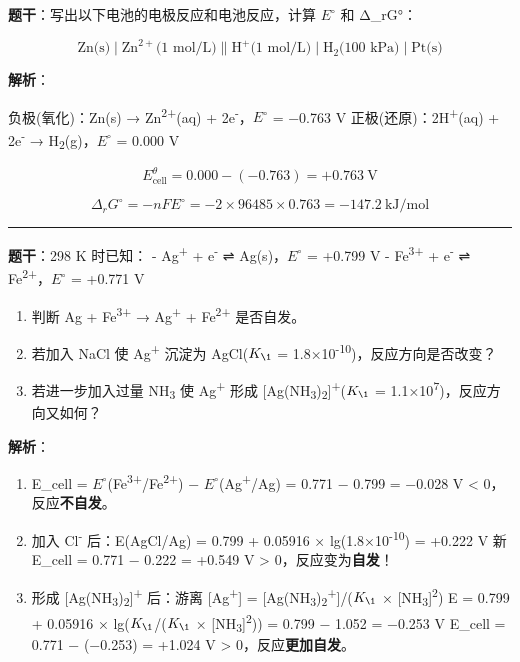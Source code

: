 \textbf{题干}：写出以下电池的电极反应和电池反应，计算 \(E^{\circ}\) 和 Δ\_rG°：

\[
\text{Zn(s)} \mid \text{Zn}^{2+}\text{(1 mol/L)} \| \text{H}^+\text{(1 mol/L)} \mid \text{H}_2\text{(100 kPa)} \mid \text{Pt(s)}
\]

\textbf{解析}：

负极(氧化)：Zn(s) → Zn\textsuperscript{2+}(aq) + 2e\textsuperscript{-}，\(E^{\circ}\) = −0.763 V
正极(还原)：2H\textsuperscript{+}(aq) + 2e\textsuperscript{-} → H\textsubscript{2}(g)，\(E^{\circ}\) = 0.000 V

\[E_{\text{cell}}^\theta = 0.000 - (-0.763) = +0.763\ \mathrm{V}\]

\[\Delta_rG^\circ = -nFE^\circ = -2 \times 96485 \times 0.763 = -147.2\ \mathrm{kJ/mol}\]

\begin{center}\rule{0.5\linewidth}{0.5pt}\end{center}

\textbf{题干}：298 K 时已知：
- Ag\textsuperscript{+} + e\textsuperscript{-} ⇌ Ag(s)，\(E^{\circ}\) = +0.799 V
- Fe\textsuperscript{3+} + e\textsuperscript{-} ⇌ Fe\textsuperscript{2+}，\(E^{\circ}\) = +0.771 V

\begin{enumerate}
\def\labelenumi{(\alph{enumi})}
\tightlist
\item
  判断 Ag + Fe\textsuperscript{3+} → Ag\textsuperscript{+} + Fe\textsuperscript{2+} 是否自发。
\item
  若加入 NaCl 使 Ag\textsuperscript{+} 沉淀为 AgCl(\(K_{\1}\) = 1.8×10\textsuperscript{-10})，反应方向是否改变？
\item
  若进一步加入过量 NH\textsubscript{3} 使 Ag\textsuperscript{+} 形成 {[}Ag(NH\textsubscript{3})\textsubscript{2}{]}\textsuperscript{+}(\(K_{\1}\) = 1.1×10\textsuperscript{7})，反应方向又如何？
\end{enumerate}

\textbf{解析}：

\begin{enumerate}
\def\labelenumi{(\alph{enumi})}
\item
  E\_cell = \(E^{\circ}\)(Fe\textsuperscript{3+}/Fe\textsuperscript{2+}) − \(E^{\circ}\)(Ag\textsuperscript{+}/Ag) = 0.771 − 0.799 = −0.028 V \textless{} 0，反应\textbf{不自发}。
\item
  加入 Cl\textsuperscript{-} 后：E(AgCl/Ag) = 0.799 + 0.05916 × lg(1.8×10\textsuperscript{-10}) = +0.222 V
  新 E\_cell = 0.771 − 0.222 = +0.549 V \textgreater{} 0，反应变为\textbf{自发}！
\item
  形成 {[}Ag(NH\textsubscript{3})\textsubscript{2}{]}\textsuperscript{+} 后：游离 {[}Ag\textsuperscript{+}{]} = {[}Ag(NH\textsubscript{3})\textsubscript{2}\textsuperscript{+}{]}/(\(K_{\1}\) × {[}NH\textsubscript{3}{]}\textsuperscript{2})
  E = 0.799 + 0.05916 × lg(\(K_{\1}\)/(\(K_{\1}\) × {[}NH\textsubscript{3}{]}\textsuperscript{2})) = 0.799 − 1.052 = −0.253 V
  E\_cell = 0.771 − (−0.253) = +1.024 V \textgreater{} 0，反应\textbf{更加自发}。
\end{enumerate}

